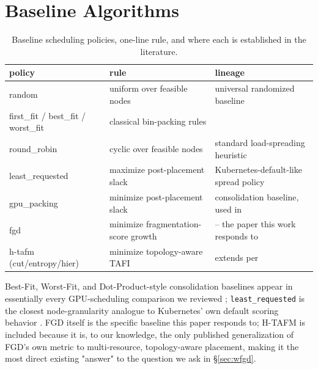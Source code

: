 \documentclass[11pt]{article}
\begin{document}
\section{Baseline Algorithms}
\label{sec:baselines}
\begin{table}[h]
\centering
\caption{Baseline scheduling policies, one-line rule, and where each is
established in the literature.}
\small
\begin{tabular}{@{}p{2.6cm}p{4.3cm}p{6.3cm}@{}}
\toprule
policy & rule & lineage \\
\midrule
random & uniform over feasible nodes & universal randomized baseline \\
first\_fit / best\_fit / worst\_fit & classical bin-packing rules & \citet{johnson1974,coffman1984} \\
round\_robin & cyclic over feasible nodes & standard load-spreading heuristic \\
least\_requested & maximize post-placement slack & Kubernetes-default-like spread policy \citep{borg2016} \\
gpu\_packing & minimize post-placement slack & consolidation baseline, used in \citet{fgd2023} \\
fgd & minimize fragmentation-score growth & \citet{fgd2023} -- the paper this work responds to \\
h-tafm (cut/entropy/hier) & minimize topology-aware TAFI & extends \citet{fgd2023} per \citet{defrag2015,hypergraph_survey2026} \\
\bottomrule
\end{tabular}
\end{table}
Best-Fit, Worst-Fit, and Dot-Product-style consolidation baselines appear
in essentially every GPU-scheduling comparison we reviewed
\citep{fgd2023,pwr2024}; \texttt{least\_requested} is the closest
node-granularity analogue to Kubernetes' own default scoring behavior
\citep{borg2016}. FGD itself is the specific baseline this paper responds
to; H-TAFM is included because it is, to our knowledge, the only
published generalization of FGD's own metric to multi-resource,
topology-aware placement, making it the most direct existing "answer" to
the question we ask in \S\ref{sec:wfgd}.

\end{document}
